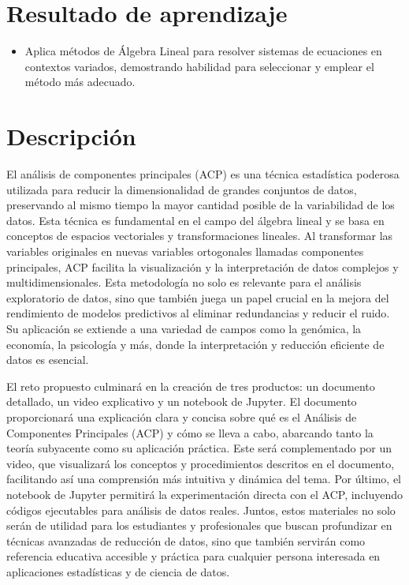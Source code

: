 \documentclass[a4,11pt]{aleph-notas}
\begin{document}
\encabezado

\section{Resultado de aprendizaje}

\begin{itemize}
\item 
    Aplica métodos de Álgebra Lineal para resolver sistemas de ecuaciones en contextos variados, demostrando habilidad para seleccionar y emplear el método más adecuado.
\end{itemize}


\section{Descripción}

El análisis de componentes principales (ACP) es una técnica estadística poderosa utilizada para reducir la dimensionalidad de grandes conjuntos de datos, preservando al mismo tiempo la mayor cantidad posible de la variabilidad de los datos. Esta técnica es fundamental en el campo del álgebra lineal y se basa en conceptos de espacios vectoriales y transformaciones lineales. Al transformar las variables originales en nuevas variables ortogonales llamadas componentes principales, ACP facilita la visualización y la interpretación de datos complejos y multidimensionales. Esta metodología no solo es relevante para el análisis exploratorio de datos, sino que también juega un papel crucial en la mejora del rendimiento de modelos predictivos al eliminar redundancias y reducir el ruido. Su aplicación se extiende a una variedad de campos como la genómica, la economía, la psicología y más, donde la interpretación y reducción eficiente de datos es esencial.

El reto propuesto culminará en la creación de tres productos: un documento detallado, un video explicativo y un notebook de Jupyter. El documento proporcionará una explicación clara y concisa sobre qué es el Análisis de Componentes Principales (ACP) y cómo se lleva a cabo, abarcando tanto la teoría subyacente como su aplicación práctica. Este será complementado por un video, que visualizará los conceptos y procedimientos descritos en el documento, facilitando así una comprensión más intuitiva y dinámica del tema. Por último, el notebook de Jupyter permitirá la experimentación directa con el ACP, incluyendo códigos ejecutables para análisis de datos reales. Juntos, estos materiales no solo serán de utilidad para los estudiantes y profesionales que buscan profundizar en técnicas avanzadas de reducción de datos, sino que también servirán como referencia educativa accesible y práctica para cualquier persona interesada en aplicaciones estadísticas y de ciencia de datos.
\end{document}
